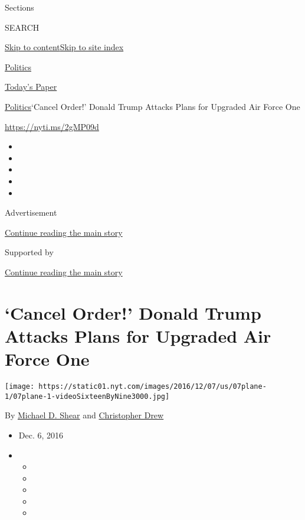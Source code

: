 Sections

SEARCH

\protect\hyperlink{site-content}{Skip to
content}\protect\hyperlink{site-index}{Skip to site index}

\href{https://www.nytimes.com/section/politics}{Politics}

\href{https://myaccount.nytimes.com/auth/login?response_type=cookie\&client_id=vi}{}

\href{https://www.nytimes.com/section/todayspaper}{Today's Paper}

\href{/section/politics}{Politics}\textbar{}`Cancel Order!' Donald Trump
Attacks Plans for Upgraded Air Force One

\url{https://nyti.ms/2gMP09d}

\begin{itemize}
\item
\item
\item
\item
\item
\end{itemize}

Advertisement

\protect\hyperlink{after-top}{Continue reading the main story}

Supported by

\protect\hyperlink{after-sponsor}{Continue reading the main story}

\hypertarget{cancel-order-donald-trump-attacks-plans-for-upgraded-air-force-one}{%
\section{`Cancel Order!' Donald Trump Attacks Plans for Upgraded Air
Force
One}\label{cancel-order-donald-trump-attacks-plans-for-upgraded-air-force-one}}

\texttt{[image: https://static01.nyt.com/images/2016/12/07/us/07plane-1/07plane-1-videoSixteenByNine3000.jpg]}

By \href{http://www.nytimes.com/by/michael-d-shear}{Michael D. Shear}
and \href{http://www.nytimes.com/by/christopher-drew}{Christopher Drew}

\begin{itemize}
\item
  Dec. 6, 2016
\item
  \begin{itemize}
  \item
  \item
  \item
  \item
  \item
  \end{itemize}
\end{itemize}

